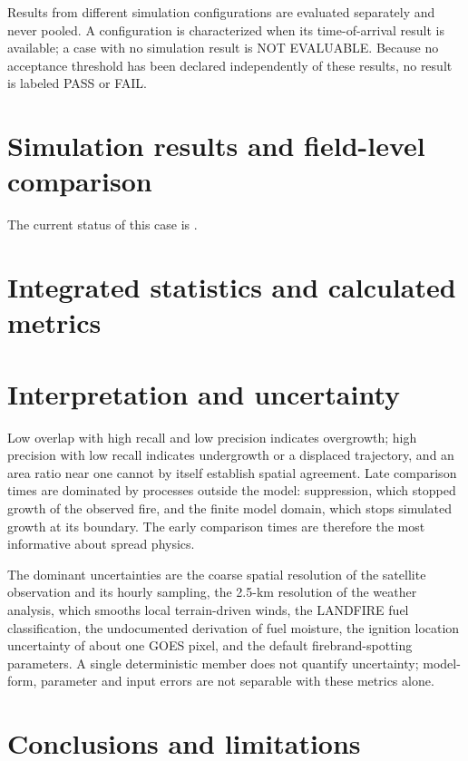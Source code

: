 Results from different simulation configurations are evaluated separately and
never pooled.  A configuration is characterized when its time-of-arrival
result is available; a case with no simulation result is NOT EVALUABLE.
Because no acceptance threshold has been declared independently of these
results, no result is labeled PASS or FAIL.

\section{Simulation results and field-level comparison}

The current status of this case is \textbf{}.  

\SimulationFields{}

\section{Integrated statistics and calculated metrics}

\IntegratedResults{}

\SimulationMetrics{}

\section{Interpretation and uncertainty}

Low overlap with high recall and low precision indicates overgrowth; high
precision with low recall indicates undergrowth or a displaced trajectory, and
an area ratio near one cannot by itself establish spatial agreement.  Late
comparison times are dominated by processes outside the model: suppression,
which stopped growth of the observed fire, and the finite model domain, which
stops simulated growth at its boundary.  The early comparison times are
therefore the most informative about spread physics.  \CaseInterpretation{}

The dominant uncertainties are the coarse spatial resolution of the satellite
observation and its hourly sampling, the 2.5-km resolution of the weather
analysis, which smooths local terrain-driven winds, the LANDFIRE fuel
classification, the undocumented derivation of fuel moisture, the ignition
location uncertainty of about one GOES pixel, and the default firebrand-spotting
parameters.  A single deterministic member does not quantify uncertainty;
model-form, parameter and input errors are not separable with these metrics
alone.

\section{Conclusions and limitations}

